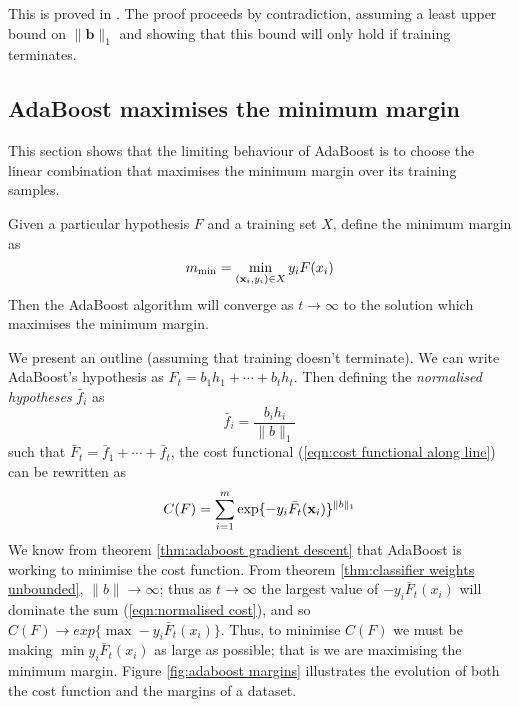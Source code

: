 \proof This is proved in \cite{Breiman97}.  The proof proceeds by
contradiction, assuming a least upper bound on $\|\mathbf{b}\|_1$ and
showing that this bound will only hold if training terminates.


\subsection{AdaBoost maximises the minimum margin}

This section shows that the limiting behaviour of AdaBoost is to
choose the linear combination that maximises the minimum margin over
its training samples.

\begin{theorem}
\label{thm:maximises minimum margin}
Given a particular hypothesis $F$ and a training set $X$, define the
minimum margin as 
\[
m_{\min} = \min_{(\mathbf{x}_i,y_i) \in X} y_i F(x_i)
\]
Then the AdaBoost algorithm will converge as $t \rightarrow \infty$ to
the solution which maximises the minimum margin.
\end{theorem}

\proof We present an outline (assuming that training doesn't
terminate).  We can write AdaBoost's hypothesis as $F_t = b_1 h_1 +
\cdots + b_t h_t$. Then defining the \emph{normalised hypotheses}
$\bar{f}_i$ as  
%
\begin{equation}
\bar{f}_i = \frac{b_i h_i}{\|b\|_1}
\end{equation}
%
such that $\bar{F}_t = \bar{f}_1 + \cdots + \bar{f}_t$, the cost
functional (\ref{eqn:cost functional along line}) can be rewritten as
%
\begin{equation}
\label{eqn:normalised cost}
C(F) = \sum_{i=1}^{m} \exp\{-y_i \bar{F}_t(\mathbf{x}_i)\}^{\|b\|_1}
\end{equation}
%
We know from theorem \ref{thm:adaboost gradient descent} that
AdaBoost is working to minimise the cost function.  From theorem
\ref{thm:classifier weights unbounded},  $\|b\| \rightarrow \infty$;
thus as $t \rightarrow \infty$ the largest value of $-y_i
\bar{F}_t(x_i)$ will dominate the sum (\ref{eqn:normalised cost}), and
so $C(F) \rightarrow exp\{\max -y_i \bar{F}_t(x_i)\}$.  Thus, to  
minimise $C(F)$ we must be making $\min y_i \bar{F}_t(x_i)$ as large
as possible; that is we are maximising the minimum margin.  Figure 
\ref{fig:adaboost margins} illustrates the evolution of both the cost
function and the margins of a dataset.

